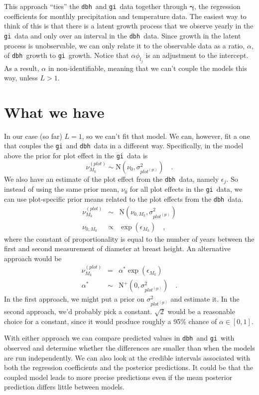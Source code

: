 \documentclass[12pt]{article}
\newcommand{\gi}{{\tt gi}}
\newcommand{\dbh}{{\tt dbh}}
\begin{document}
This approach ``ties'' the \dbh\ and \gi\ data together through
$\bm\gamma$, the regression coefficients for monthly precipitation and
temperature data. The easiest way to think of this is that there is a
latent growth process that we observe yearly in the \gi\ data and only
over an interval in the \dbh\ data. Since growth in the latent process
is unobservable, we can only relate it to the observable data as a
ratio, $\alpha$, of \dbh\ growth to \gi\ growth. Notice that
$\alpha\phi_{l_j}$ is an adjustment to the intercept. As a result,
$\alpha$ in non-identifiable, meaning that we can't couple the models
this way, unless $L > 1$.

\section*{What we have}

In our case (so far) $L = 1$, so we can't fit that model. We can,
however, fit a one that couples the \gi\ and \dbh\ data in a different
way. Specifically, in the model above the prior for plot effect in the
\gi\ data is
\[
\nu^{(plot)}_{M_k} \sim \mbox{N}(\nu_0, \sigma^2_{plot^{(gi)}})
\quad .
\]
We also have an estimate of the plot effect from the \dbh\ data,
namely $\epsilon_j$. So instead of using the same prior mean, $\nu_0$
for all plot effects in the \gi\ data, we can use plot-specific prior
means related to the plot effects from the \dbh\ data.
\begin{eqnarray*}
\nu^{(plot)}_{M_k} &\sim& \mbox{N}(\nu_{0,{M_k}},
                          \sigma^2_{plot^{(gi)}}) \\
\nu_{0,{M_k}} &\propto& \exp(\epsilon_{M_k}) \quad ,
\end{eqnarray*}
where the constant of proportionality is equal to the number of years
between the first and second measurement of diameter at breast
height. An alternative approach would be
\begin{eqnarray*}
\nu^{(plot)}_{M_k} &=& \alpha^*\exp(\epsilon_{M_k}) \\
\alpha^* &\sim& \mbox{N}^+(0,\sigma^2_{plot^{(gi)}}) \quad .
\end{eqnarray*}
In the first approach, we might put a prior on
$\sigma^2_{plot^{(gi)}}$ and estimate it. In the second approach, we'd
probably pick a constant. $\sqrt 2$ would be a reasonable choice for a
constant, since it would produce roughly a 95\% chance of
$\alpha \in [0,1]$.

With either approach we can compare predicted values in \dbh\ and \gi\
with observed and determine whether the differences are smaller than
when the models are run independently. We can also look at the
credible intervals associated with both the regression coefficients
and the posterior predictions. It could be that the coupled model
leads to more precise predictions even if the mean posterior
prediction differs little between models.
\end{document}
